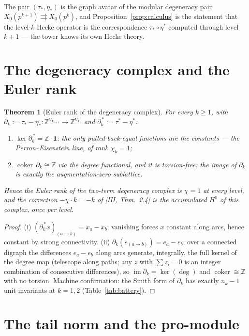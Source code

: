 \documentclass[11pt]{amsart}
\numberwithin{equation}{section}
\newtheorem{theorem}{Theorem}[section]
\theoremstyle{definition}
\theoremstyle{remark}
\newcommand{\Z}{\mathbb{Z}}
\newcommand{\coker}{\operatorname{coker}}
\newcommand{\ta}{\tau_*}
\newcommand{\taup}{\tau^*}
\newcommand{\et}{\eta_*}
\newcommand{\etp}{\eta^*}
\begin{document}
The pair $(\ta,\et)$ is the graph avatar of the modular degeneracy pair
$X_0(p^{k+1})\rightrightarrows X_0(p^k)$, and Proposition~\ref{prop:calculus} is the
statement that the level-$k$ Hecke operator is the correspondence
$\ta\circ\etp$ computed through level $k{+}1$ --- the tower knows its own Hecke
theory.

\section{The degeneracy complex and the Euler rank}\label{sec:euler}

\begin{theorem}[Euler rank of the degeneracy complex]\label{thm:euler}
For every $k\ge1$, with $\partial_k:=\ta-\et\colon\Z^{V_{Y_{k+1}}}\to\Z^{V_{Y_k}}$ and
$\partial_k^{\,*}:=\taup-\etp$:
\begin{enumerate}
\item[(i)] $\ker\partial_k^{\,*}=\Z\cdot\mathbf1$: the only pulled-back-equal
functions are the constants --- the Perron--Eisenstein line, of rank $\chi_k=1$;
\item[(ii)] $\coker\,\partial_k\cong\Z$ via the degree functional, and it is
torsion-free: the image of $\partial_k$ is exactly the augmentation-zero sublattice.
\end{enumerate}
Hence the Euler rank of the two-term degeneracy complex is $\chi=1$ at every level,
and the correction $-\chi\cdot k=-k$ of {\rm[III, Thm.~2.4]} is the accumulated
$H^0$ of this complex, once per level.
\end{theorem}

\begin{proof}
(i) $(\partial_k^{\,*}x)_{(a\to b)}=x_a-x_b$; vanishing forces $x$ constant along
arcs, hence constant by strong connectivity. (ii) $\partial_k(e_{(a\to b)})
=e_a-e_b$; over a connected digraph the differences $e_a-e_b$ along arcs generate,
integrally, the full kernel of the degree map (telescope along paths; any
$z$ with $\sum z_i=0$ is an integer combination of consecutive differences), so
$\operatorname{im}\partial_k=\ker(\deg)$ and $\coker\cong\Z$ with no torsion.
Machine confirmation: the Smith form of $\partial_k$ has exactly $n_k-1$ unit
invariants at $k=1,2$ (Table~\ref{tab:battery}).
\end{proof}

\section{The tail norm and the pro-module}\label{sec:norm}
\end{document}
